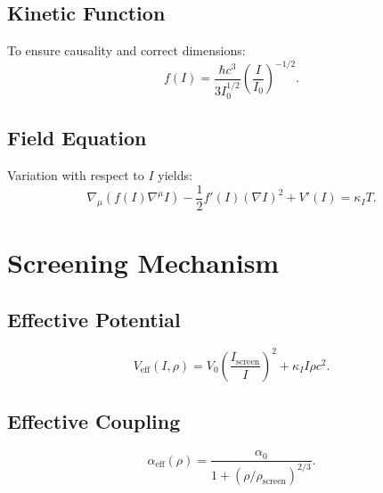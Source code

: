 \documentclass[12pt, a4paper]{article}
\begin{document}
\subsection{Kinetic Function}

To ensure causality and correct dimensions:
\begin{equation}
    f(I) = \frac{\hbar c^3}{3 I_0^{1/2}} \left(\frac{I}{I_0}\right)^{-1/2}.
\end{equation}

\subsection{Field Equation}

Variation with respect to $I$ yields:
\begin{equation}
    \nabla_\mu \left( f(I) \nabla^\mu I \right) - \frac{1}{2} f'(I) (\nabla I)^2 + V'(I) = \kappa_I T.
\end{equation}


\section{Screening Mechanism}

\subsection{Effective Potential}

\begin{equation}
    V_{\text{eff}}(I, \rho) = V_0 \left(\frac{I_{\text{screen}}}{I}\right)^2 + \kappa_I I \rho c^2.
\end{equation}

\subsection{Effective Coupling}

\begin{equation}
    \alpha_{\text{eff}}(\rho) = \frac{\alpha_0}{1 + (\rho/\rho_{\text{screen}})^{2/3}}.
\end{equation}

\end{document}

